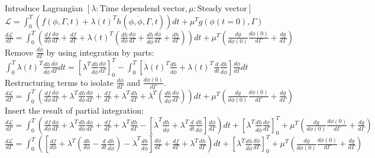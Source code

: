 \documentclass[10pt]{article} %
\begin{document}
\begin{center}
	Introduce Lagrangian $\left[\lambda: \text{Time dependend vector}, \mu: \text{Steady vector}\right]$\\
	$\mathcal{L} = \int_{0}^{T} \left(f(\phi,\Gamma,t) + \lambda(t)^T h(\phi,\dot \phi,\Gamma,t)\right)dt + \mu^T g(\phi(t=0),\Gamma)$\\
	$\frac{d \mathcal{L}}{d\Gamma} = \int_{0}^{T} \left(\frac{df}{d\phi}\frac{d\phi}{d\Gamma} + \frac{df}{d\Gamma} + \lambda(t)^T \left( \frac{dh}{d\phi}\frac{d\phi}{d\Gamma} + \frac{dh}{d\dot \phi}\frac{d\dot \phi}{d\Gamma} + \frac{dh}{d\Gamma}\right) \right)dt + \mu^T \left( \frac{d g}{d\phi(0)} \frac{d \phi(0)}{d\Gamma} + \frac{dg}{d\Gamma} \right)$\\
	Remove $\frac{d\dot \phi}{d\Gamma}$ by using integration by parts:\\
	$\int_{0}^{T} \lambda(t)^T \frac{dh}{d\dot \phi}\frac{d\dot \phi}{d\Gamma} dt = \left[ \lambda^T \frac{dh}{d\dot \phi}\frac{d \phi}{d\Gamma} \right]_0 ^T - \int_{0}^{T} \left[\dot \lambda(t)^T \frac{dh}{d\dot \phi} + \lambda(t)^T \frac{d}{dt}\frac{dh}{d\dot \phi}\right]\frac{d \phi}{d\Gamma} dt$\\
	Restructuring terms to isolate $\frac{d\phi}{d\Gamma}$ and $\frac{d\phi(0)}{d\Gamma}$.\\
	$\frac{d \mathcal{L}}{d\Gamma} = \int_{0}^{T} \left(\frac{df}{d\phi}\frac{d\phi}{d\Gamma} + \lambda^T \frac{dh}{d\phi}\frac{d\phi}{d\Gamma} + \frac{df}{d\Gamma} + \lambda^T \frac{dh}{d\Gamma} +\lambda^T \left( \frac{dh}{d\dot \phi}\frac{d\dot \phi}{d\Gamma}\right) \right)dt + \mu^T \left( \frac{d g}{d\phi(0)} \frac{d \phi(0)}{d\Gamma} + \frac{dg}{d\Gamma} \right)$\\
	Insert the result of partial integration:\\
	$\frac{d \mathcal{L}}{d\Gamma} = \int_{0}^{T} \left(\frac{df}{d\phi}\frac{d\phi}{d\Gamma} + \lambda^T \frac{dh}{d\phi}\frac{d\phi}{d\Gamma} + \frac{df}{d\Gamma} + \lambda^T \frac{dh}{d\Gamma} - \left[\dot \lambda^T \frac{dh}{d\dot \phi} + \lambda^T \frac{d}{dt}\frac{dh}{d\dot \phi}\right]\frac{d \phi}{d\Gamma} \right)dt + \left[ \lambda^T \frac{dh}{d\dot \phi}\frac{d \phi}{d\Gamma} \right]_0 ^T + \mu^T \left( \frac{d g}{d\phi(0)} \frac{d \phi(0)}{d\Gamma} + \frac{dg}{d\Gamma} \right)$\\
	$\frac{d \mathcal{L}}{d\Gamma} = \int_{0}^{T} \left(\left[\frac{df}{d\phi} + \lambda^T \left( \frac{dh}{d\phi} -  \frac{d}{dt}\frac{dh}{d\dot \phi}\right) -\dot \lambda^T \frac{dh}{d\dot \phi}\right]\frac{d \phi}{d\Gamma} + \frac{df}{d\Gamma} + \lambda^T \frac{dh}{d\Gamma}\right)dt + \left[ \lambda^T \frac{dh}{d\dot \phi}\frac{d \phi}{d\Gamma} \right]_0 ^T + \mu^T \left( \frac{d g}{d\phi(0)} \frac{d \phi(0)}{d\Gamma} + \frac{dg}{d\Gamma} \right)$\\

\end{center}
\end{document}
